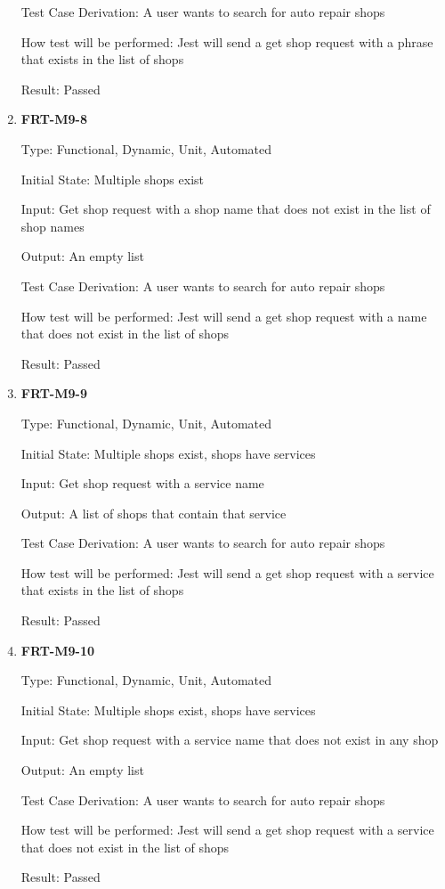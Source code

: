 \documentclass[12pt, titlepage]{article}
\begin{document}
\begin{enumerate}
	      Test Case Derivation: A user wants to search for auto repair shops

	      How test will be performed: Jest will send a get shop request with a phrase that exists in the list
	      of shops

	      Result: Passed

	\item \textbf{FRT-M9-8}

	      Type: Functional, Dynamic, Unit, Automated

	      Initial State: Multiple shops exist

	      Input: Get shop request with a shop name that does not exist in the list of shop names

	      Output: An empty list

	      Test Case Derivation: A user wants to search for auto repair shops

	      How test will be performed: Jest will send a get shop request with a name that does not exist in
	      the list of shops

	      Result: Passed

	\item \textbf{FRT-M9-9}

	      Type: Functional, Dynamic, Unit, Automated

	      Initial State: Multiple shops exist, shops have services

	      Input: Get shop request with a service name

	      Output: A list of shops that contain that service

	      Test Case Derivation: A user wants to search for auto repair shops

	      How test will be performed: Jest will send a get shop request with a service that exists in the
	      list of shops

	      Result: Passed

	\item \textbf{FRT-M9-10}

	      Type: Functional, Dynamic, Unit, Automated

	      Initial State: Multiple shops exist, shops have services

	      Input: Get shop request with a service name that does not exist in any shop

	      Output: An empty list

	      Test Case Derivation: A user wants to search for auto repair shops

	      How test will be performed: Jest will send a get shop request with a service that does not exist in
	      the list of shops

	      Result: Passed

\end{enumerate}
\end{document}
